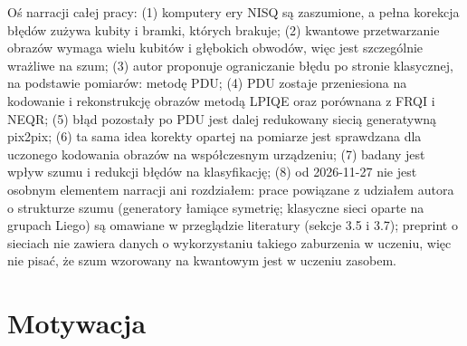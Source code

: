 {Oś narracji całej pracy:
(1) komputery ery NISQ są zaszumione, a pełna korekcja błędów zużywa kubity i bramki, których brakuje;
(2) kwantowe przetwarzanie obrazów wymaga wielu kubitów i głębokich obwodów, więc jest szczególnie wrażliwe na szum;
(3) autor proponuje ograniczanie błędu po stronie klasycznej, na podstawie pomiarów: metodę PDU;
(4) PDU zostaje przeniesiona na kodowanie i rekonstrukcję obrazów metodą LPIQE oraz porównana z FRQI i NEQR;
(5) błąd pozostały po PDU jest dalej redukowany siecią generatywną pix2pix;
(6) ta sama idea korekty opartej na pomiarze jest sprawdzana dla uczonego kodowania obrazów na współczesnym urządzeniu;
(7) badany jest wpływ szumu i redukcji błędów na klasyfikację;
(8) od 2026-11-27 nie jest osobnym elementem narracji ani rozdziałem: prace powiązane z udziałem autora o strukturze szumu (generatory łamiące symetrię; klasyczne sieci oparte na grupach Liego) są omawiane w przeglądzie literatury (sekcje 3.5 i 3.7); preprint o sieciach nie zawiera danych o wykorzystaniu takiego zaburzenia w uczeniu, więc nie pisać, że szum wzorowany na kwantowym jest w uczeniu zasobem.
}

\section{Motywacja}\label{sec:introduction:motivation}

